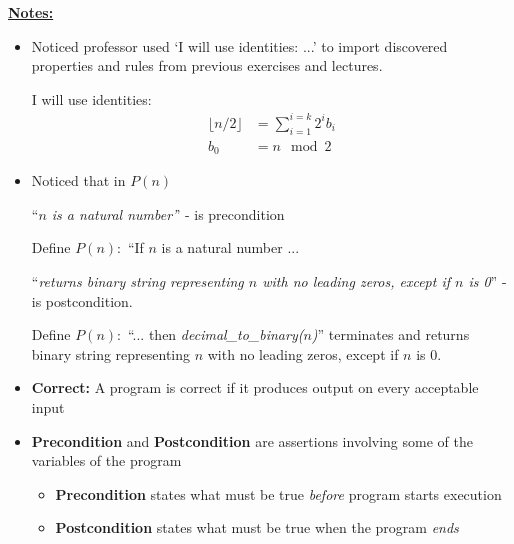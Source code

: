\documentclass[12pt]{article}
\begin{document}
\bigskip

\underline{\textbf{Notes:}}

\bigskip

\begin{itemize}
    \item Noticed professor used `I will use identities: ...' to import discovered properties
    and rules from previous exercises and lectures.

    \begin{mdframed}
    I will use identities:
    \setcounter{equation}{0}
    \begin{align}
        \lfloor n/2 \rfloor &= \sum\limits_{i=1}^{i=k} 2^ib_i\\
        b_0 &= n \mod 2
    \end{align}

    \end{mdframed}

    \item Noticed that in $P(n)$

    \bigskip

    ``\textit{$n$ is a natural number'}' - is precondition

    \bigskip

    \begin{mdframed}
    Define $P(n):$ ``If $n$ is a natural number ...
    \end{mdframed}

    \bigskip

    ``\textit{returns binary string representing $n$ with no leading zeros,
    except if $n$ is 0}'' - is postcondition.

    \bigskip

    \begin{mdframed}
    Define $P(n):$ ``... then \textit{decimal\_to\_binary($n$)}''
    terminates and returns binary string representing $n$ with no leading zeros,
    except if $n$ is 0.
    \end{mdframed}

    \item \textbf{Correct:} A program is correct if it produces output on every acceptable input
    \item \textbf{Precondition} and \textbf{Postcondition} are assertions involving some of the variables of the program
    \begin{itemize}
        \item \textbf{Precondition} states what must be true \textit{before} program starts execution
        \item \textbf{Postcondition} states what must be true when the program \textit{ends}
    \end{itemize}
\end{itemize}
\end{document}
